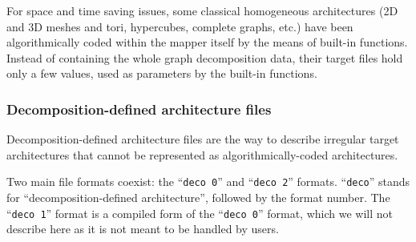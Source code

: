 For space and time saving issues, some classical homogeneous architectures
(2D and 3D meshes and tori, hypercubes, complete graphs, etc\@.) have been
algorithmically coded within the mapper itself by the means of built-in
functions.
Instead of containing the whole graph decomposition data, their target
files hold only a few values, used as parameters by the built-in functions.

\subsubsection{Decomposition-defined architecture files}
\label{sec-file-target-deco}

Decomposition-defined architecture files are the way to describe
irregular target architectures that cannot be represented as
algorithmically-coded architectures.

Two main file formats coexist: the ``\texttt{deco 0}'' and
``\texttt{deco 2}'' formats. ``\texttt{deco}'' stands for
``decomposition-defined architecture'', followed by the format
number. The ``\texttt{deco 1}'' format is a compiled form of the
``\texttt{deco 0}'' format, which we will not describe here as it is
not meant to be handled by users.

